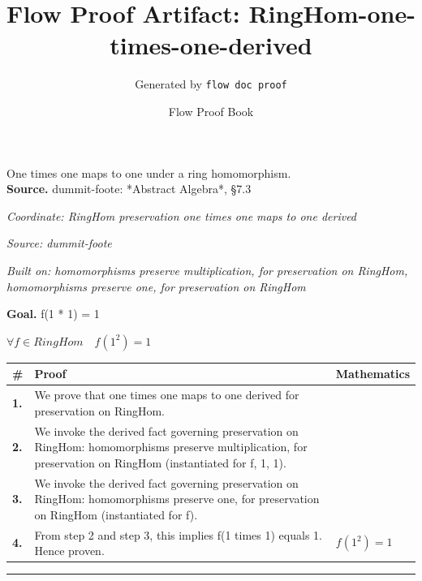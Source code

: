 \documentclass[11pt]{article}
\title{Flow Proof Artifact: RingHom-one-times-one-derived}
\author{Generated by \texttt{flow doc proof}}
\date{Flow Proof Book}
\theoremstyle{definition}
\begin{document}
\maketitle
One times one maps to one under a ring homomorphism.\\[0.5em]
\textbf{Source.} dummit-foote: *Abstract Algebra*, §7.3\\[0.5em]
\bigskip
{}\par
\smallskip\noindent\textit{Coordinate: RingHom \cdot preservation \cdot one times one maps to one derived}\par
\smallskip\noindent\textit{Source: dummit-foote}\par
\smallskip\noindent\textit{Built on: homomorphisms preserve multiplication, for preservation on RingHom, homomorphisms preserve one, for preservation on RingHom}\par
\medskip
\noindent\textbf{Goal.} f(1 * 1) = 1\par
\noindent$\displaystyle \forall f \in RingHom\quad f(1^{2}) = 1$\par
\medskip
\noindent
\begin{tabular}{@{} >{\raggedright\arraybackslash}p{} >{\raggedright\arraybackslash}p{} >{\raggedleft\arraybackslash}p{} @{}}
\textbf{\#} & \textbf{Proof} & \textbf{Mathematics} \\
\midrule
\textbf{1.} & We prove that one times one maps to one derived for preservation on RingHom. & \\[0.45em]
\textbf{2.} & We invoke the derived fact governing preservation on RingHom: homomorphisms preserve multiplication, for preservation on RingHom (instantiated for f, 1, 1). & \\[0.45em]
\textbf{3.} & We invoke the derived fact governing preservation on RingHom: homomorphisms preserve one, for preservation on RingHom (instantiated for f). & \\[0.45em]
\textbf{4.} & From step 2 and step 3, this implies f(1 times 1) equals 1. Hence proven. & $\displaystyle f(1^{2}) = 1$ \\[0.45em]
\bottomrule
\end{tabular}
\label{thm:RingHom-preservation-one_times_one_maps_to_one_derived}
\par\medskip\hrule
\end{document}
